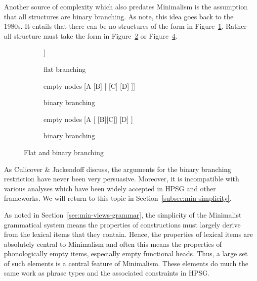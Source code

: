 \documentclass[output=paper]{langsci/langscibook}
\begin{document}
Another source of complexity which also predates Minimalism is the assumption that all structures are binary branching. As  \citet[112--116]{CJ2005a} note, this idea goes back to the 1980s. It entails that there can be no structures of the form in Figure~\ref{fig:min-trinary}. Rather all structure must take the form in Figure~\ref{fig:min-binary-a} or Figure~\ref{fig:min-binary-b}.
\begin{figure}
\hfill
\begin{subfigure}{0.3\textwidth}
\centering
	\begin{forest} %
		[A
		[B][C][D]
		]
	\end{forest}
	\caption{\label{fig:min-trinary}flat branching}
\end{subfigure}
\hfill
\begin{subfigure}{0.3\textwidth}
\centering
	\begin{forest} %
		empty nodes
		[A
		[B]
		[{} [C] [D]
		]]
	\end{forest}
	\caption{\label{fig:min-binary-a}binary branching}
\end{subfigure}
\hfill
\begin{subfigure}{0.3\textwidth}
\centering
	\begin{forest} %
		empty nodes
		[A
		[{} [B][C]]
		[D]
		]
	\end{forest}
	\caption{\label{fig:min-binary-b}binary branching}
\end{subfigure}
\hfill\mbox{}
\caption{Flat and binary branching}
\end{figure}

As Culicover \& Jackendoff discuss, the arguments for the binary branching restriction have never been very persuasive. Moreover, it is incompatible with various analyses which have been widely accepted in HPSG and other frameworks. We will return to this topic in Section~\ref{subsec:min-simplicity}.

As noted in Section~\ref{sec:min-views-grammar}, the simplicity of the Minimalist grammatical system means the properties of constructions must largely derive from the lexical items that they contain. Hence, the properties of lexical items are absolutely central to Minimalism and often this means the properties of phonologically empty items, especially empty functional heads. Thus, a large set of such elements is a central feature of Minimalism. These elements do much the same work as phrase types and the associated constraints in HPSG.
\end{document}
